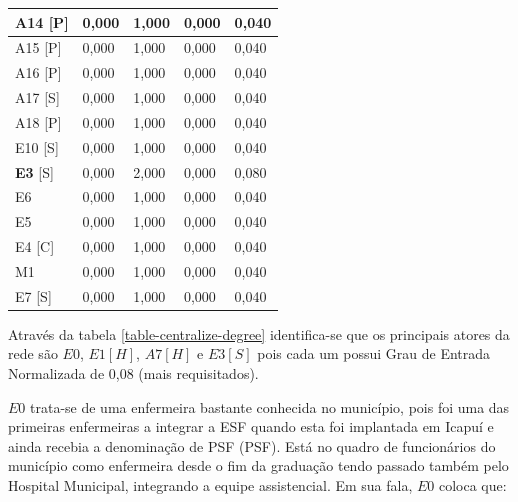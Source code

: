 \begin{table}[htbp]
\begin{tabular}{|l|l|l|l|l|}
A14 {[}P{]}   & 0,000         & 1,000           & 0,000                     & 0,040                       \\ \hline
A15 {[}P{]}   & 0,000         & 1,000           & 0,000                     & 0,040                       \\ \hline
A16 {[}P{]}   & 0,000         & 1,000           & 0,000                     & 0,040                       \\ \hline
A17 {[}S{]}   & 0,000         & 1,000           & 0,000                     & 0,040                       \\ \hline
A18 {[}P{]}   & 0,000         & 1,000           & 0,000                     & 0,040                       \\ \hline
E10 {[}S{]}   & 0,000         & 1,000           & 0,000                     & 0,040                       \\ \hline
\textbf{E3} {[}S{]}    & 0,000         & 2,000           & 0,000                     & 0,080                       \\ \hline
E6            & 0,000         & 1,000           & 0,000                     & 0,040                       \\ \hline
E5            & 0,000         & 1,000           & 0,000                     & 0,040                       \\ \hline
E4 {[}C{]}    & 0,000         & 1,000           & 0,000                     & 0,040                       \\ \hline
M1            & 0,000         & 1,000           & 0,000                     & 0,040                       \\ \hline
E7 {[}S{]}    & 0,000         & 1,000           & 0,000                     & 0,040                       \\ \hline
\end{tabular}
\end{table}

Através da tabela \ref{table-centralize-degree} identifica-se que os principais atores da rede são $E0$, $E1[H]$, $A7 [H]$ e  $E3[S]$ pois cada um possui Grau de Entrada Normalizada de 0,08 (mais requisitados).

$E0$ trata-se de uma enfermeira bastante conhecida no município, pois foi uma das primeiras enfermeiras a integrar a ESF quando esta foi implantada em Icapuí e ainda recebia a denominação de \acrlong{PSF} (\acrshort{PSF}). Está no quadro de funcionários do município como enfermeira desde o fim da graduação tendo passado também pelo Hospital Municipal, integrando a equipe assistencial. Em sua fala, $E0$ coloca que: 

